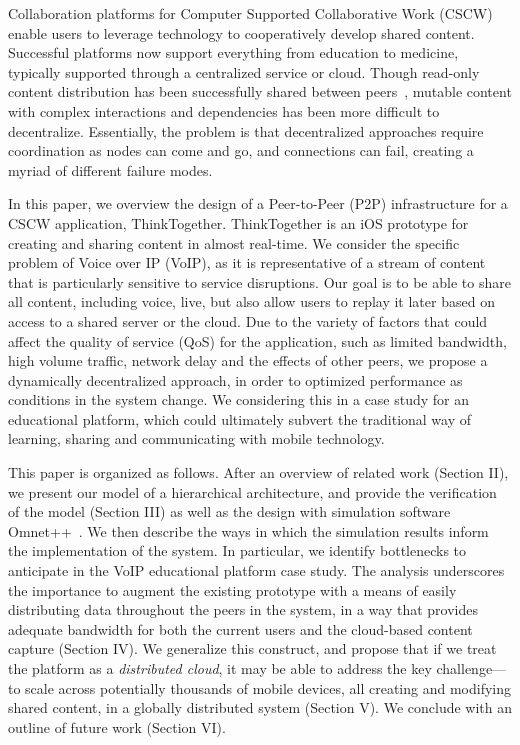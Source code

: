 Collaboration platforms for Computer Supported Collaborative Work (CSCW) enable 
users to leverage technology to cooperatively develop shared content.   
Successful platforms now support everything from education to medicine, 
typically supported through a centralized service or cloud. Though read-only 
content distribution has been successfully shared between 
peers~\cite{XG_P2P_INFO04}, mutable content with complex interactions and 
dependencies 
has been more difficult to decentralize. Essentially, the problem is that 
decentralized approaches require coordination as nodes can come and go, and 
connections can fail, creating a myriad of different failure modes.

In this paper, we overview the design of a Peer-to-Peer (P2P) infrastructure for 
a CSCW application, ThinkTogether.  ThinkTogether is an iOS prototype for 
creating and sharing content in almost real-time. We consider the specific 
problem of Voice over IP (VoIP), as it is representative of a stream of content 
that is particularly sensitive to service disruptions.  Our goal is to be able 
to share all content, including voice, live, but also allow users to replay it 
later based on access to a shared server or the cloud.   Due to the variety of 
factors that could affect the quality of service (QoS) for the application, such 
as limited bandwidth, high volume traffic, network delay and the effects of 
other peers, we propose a dynamically decentralized approach, in order to 
optimized performance as conditions in the system change.  We considering this 
in a case study for an educational platform, which could ultimately subvert the 
traditional way of learning, sharing and communicating with mobile technology.
 

This paper is organized as follows.  After an overview of related work (Section 
II), we present our model of a hierarchical architecture, and provide the 
verification of the model (Section III) as well as the design with simulation 
software Omnet++~\cite{A_OMNET_ESM01}. We then describe the ways in which 
the simulation results inform the implementation of the system.  
In particular, we identify bottlenecks to anticipate in the VoIP educational 
platform case study. The analysis underscores the importance to augment the 
existing prototype with a means of easily distributing data throughout the peers 
in the system, in a way that provides adequate bandwidth for both the current 
users and the cloud-based content capture (Section IV).  We generalize this 
construct, and propose that if we treat the platform as a {\em distributed 
cloud}, it may be able to address the key challenge---to scale across 
potentially thousands of mobile devices, all creating and modifying shared 
content, in a globally distributed system (Section V).  We conclude with an 
outline of future work (Section VI).

